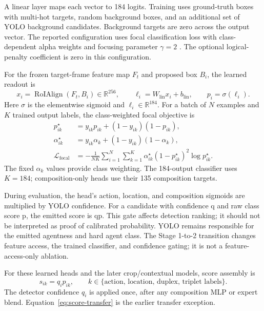 A linear layer maps each vector to 184 logits. Training uses ground-truth boxes with multi-hot targets, random background boxes, and an additional set of YOLO background candidates. Background targets are zero across the output vector. The reported configuration uses focal classification loss with class-dependent alpha weights and focusing parameter \(\gamma = 2\) \cite{focal-loss}. The optional logical-penalty coefficient is zero in this configuration.

For the frozen target-frame feature map \(F_t\) and proposed box \(B_i\), the learned readout is
\begin{equation}\label{eq:roi-head}
 x_i=\operatorname{RoIAlign}(F_t,B_i)\in\mathbb R^{256},\qquad
 \ell_i=W_{\mathrm{lin}}x_i+b_{\mathrm{lin}},\qquad p_i=\sigma(\ell_i).
\end{equation}
Here \(\sigma\) is the elementwise sigmoid and \(\ell_i\in\mathbb R^{184}\). For a batch of \(N\) examples and \(K\) trained output labels, the class-weighted focal objective is
\begin{align}
 p^{\star}_{ik}&=y_{ik}p_{ik}+(1-y_{ik})(1-p_{ik}),\nonumber\\
 \alpha^{\star}_{ik}&=y_{ik}\alpha_k+(1-y_{ik})(1-\alpha_k),\nonumber\\
 \mathcal L_{\mathrm{focal}}&=-\frac{1}{NK}\sum_{i=1}^{N}\sum_{k=1}^{K}
 \alpha^{\star}_{ik}(1-p^{\star}_{ik})^{2}\log p^{\star}_{ik}.
 \label{eq:focal}
\end{align}
The fixed \(\alpha_k\) values provide class weighting. The 184-output classifier uses \(K=184\); composition-only heads use their 135 composition targets.

During evaluation, the head’s action, location, and composition sigmoids are multiplied by YOLO confidence. For a candidate with confidence q and raw class score p, the emitted score is qp. This gate affects detection ranking; it should not be interpreted as proof of calibrated probability. YOLO remains responsible for the emitted agentness and hard agent class. The Stage 1-to-2 transition changes feature access, the trained classifier, and confidence gating; it is not a feature-access-only ablation.

For these learned heads and the later crop/contextual models, score assembly is
\begin{equation}\label{eq:score-assembly}
 s_{ik}=q_i p_{ik},\qquad k\in\{\text{action, location, duplex, triplet labels}\}.
\end{equation}
The detector confidence \(q_i\) is applied once, after any composition MLP or expert blend. Equation~\ref{eq:score-transfer} is the earlier transfer exception.

